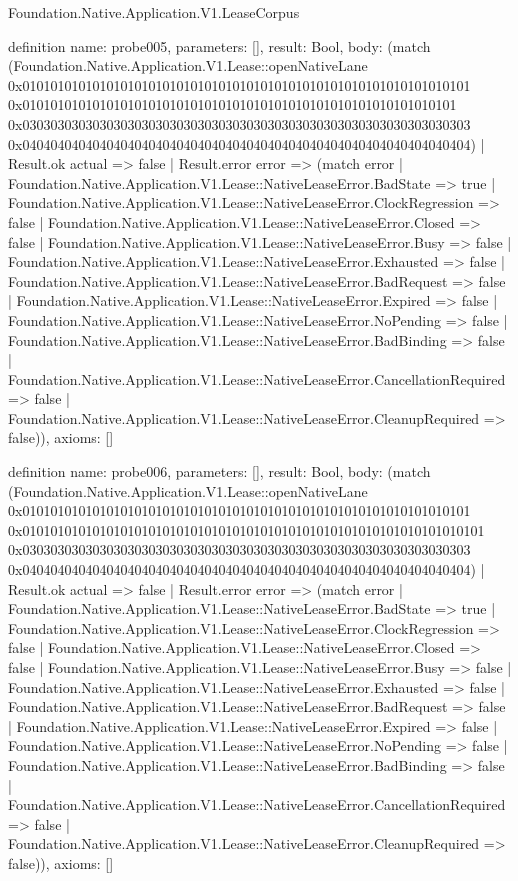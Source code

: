 \begin{lexlean}{Foundation.Native.Application.V1.LeaseCorpus}
\begin{semanticmodule}
definition{
  name: probe005,
  parameters: [],
  result: Bool,
  body: (match (Foundation.Native.Application.V1.Lease::openNativeLane 0x0101010101010101010101010101010101010101010101010101010101010101 0x01010101010101010101010101010101010101010101010101010101010101 0x0303030303030303030303030303030303030303030303030303030303030303 0x0404040404040404040404040404040404040404040404040404040404040404)
    | Result.ok actual => false
    | Result.error error => (match error
      | Foundation.Native.Application.V1.Lease::NativeLeaseError.BadState => true
      | Foundation.Native.Application.V1.Lease::NativeLeaseError.ClockRegression => false
      | Foundation.Native.Application.V1.Lease::NativeLeaseError.Closed => false
      | Foundation.Native.Application.V1.Lease::NativeLeaseError.Busy => false
      | Foundation.Native.Application.V1.Lease::NativeLeaseError.Exhausted => false
      | Foundation.Native.Application.V1.Lease::NativeLeaseError.BadRequest => false
      | Foundation.Native.Application.V1.Lease::NativeLeaseError.Expired => false
      | Foundation.Native.Application.V1.Lease::NativeLeaseError.NoPending => false
      | Foundation.Native.Application.V1.Lease::NativeLeaseError.BadBinding => false
      | Foundation.Native.Application.V1.Lease::NativeLeaseError.CancellationRequired => false
      | Foundation.Native.Application.V1.Lease::NativeLeaseError.CleanupRequired => false)),
  axioms: []
}

definition{
  name: probe006,
  parameters: [],
  result: Bool,
  body: (match (Foundation.Native.Application.V1.Lease::openNativeLane 0x0101010101010101010101010101010101010101010101010101010101010101 0x010101010101010101010101010101010101010101010101010101010101010101 0x0303030303030303030303030303030303030303030303030303030303030303 0x0404040404040404040404040404040404040404040404040404040404040404)
    | Result.ok actual => false
    | Result.error error => (match error
      | Foundation.Native.Application.V1.Lease::NativeLeaseError.BadState => true
      | Foundation.Native.Application.V1.Lease::NativeLeaseError.ClockRegression => false
      | Foundation.Native.Application.V1.Lease::NativeLeaseError.Closed => false
      | Foundation.Native.Application.V1.Lease::NativeLeaseError.Busy => false
      | Foundation.Native.Application.V1.Lease::NativeLeaseError.Exhausted => false
      | Foundation.Native.Application.V1.Lease::NativeLeaseError.BadRequest => false
      | Foundation.Native.Application.V1.Lease::NativeLeaseError.Expired => false
      | Foundation.Native.Application.V1.Lease::NativeLeaseError.NoPending => false
      | Foundation.Native.Application.V1.Lease::NativeLeaseError.BadBinding => false
      | Foundation.Native.Application.V1.Lease::NativeLeaseError.CancellationRequired => false
      | Foundation.Native.Application.V1.Lease::NativeLeaseError.CleanupRequired => false)),
  axioms: []
}


\end{semanticmodule}
\end{lexlean}
